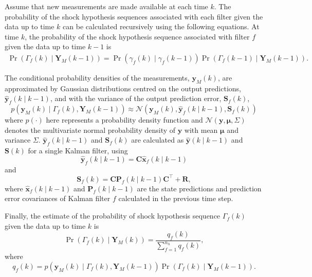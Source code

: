 {{Assume that new measurements are made available at each time $k$. The probability of the shock hypothesis sequences associated with each filter given the data up to time $k$ can be calculated recursively using the following equations. At time $k$, the probability of the shock hypothesis sequence associated with filter $f$ given the data up to time $k-1$ is
\begin{multline} \label{eq:Pr_Gammak_given_Ykm1}
	\Pr(\Gamma_f(k) \mid \mathbf{Y}_M(k-1)) = 
	\Pr(\gamma_f(k) \mid \gamma_f(k-1)) \Pr(\Gamma_f(k-1) \mid \mathbf{Y}_M(k-1)).
\end{multline}

The conditional probability densities of the measurements, $\mathbf{y}_M(k)$, are approximated by Gaussian distributions centred on the output predictions, $\mathbf{\hat{y}}_{f}(k \mid k-1)$,  and with the variance of the output prediction error, $\mathbf{S}_f(k)$,
\begin{equation} \label{eq:p_yk_given_Gammak_Ykm1}
	p(\mathbf{y}_M(k) \mid \Gamma_f(k), \mathbf{Y}_M(k-1)) \approx \mathcal{N}\left(\mathbf{y}_M(k), \mathbf{\hat{y}}_{f}(k \mid k-1),	\mathbf{S}_f(k) \right)
\end{equation}
%
where $p(\cdot)$ here represents a probability density function and $\mathcal{N}(\mathbf{y}, \mathbf{\mu}, \Sigma)$ denotes the multivariate normal probability density of $\mathbf{y}$ with mean $\mathbf{\mu}$ and variance $\Sigma$. $\mathbf{\hat{y}}_{f}(k \mid k-1)$ and $\mathbf{S}_f(k)$ are calculated as $\mathbf{\hat{y}}(k \mid k-1)$ and $\mathbf{S}(k)$ for a single Kalman filter, using 
\begin{equation} \label{eq:yfk_pred}
	\mathbf{\hat{y}}_{f}(k \mid k-1) = \mathbf{C}\mathbf{\hat{x}}_{f}(k \mid k-1)
\end{equation}
and
%
\begin{equation} \label{eq:Sfk}
	\mathbf{S}_f(k) = \mathbf{C}\mathbf{P}_f(k \mid k-1)\mathbf{C}^\intercal + \mathbf{R},
\end{equation}
where $\mathbf{\hat{x}}_{f}(k \mid k-1)$ and $\mathbf{P}_f(k \mid k-1)$ are the state predictions and prediction error covariances of Kalman filter $f$ calculated in the previous time step.

Finally, the estimate of the probability of shock hypothesis sequence $\Gamma_f(k)$ given the data up to time $k$ is
\begin{equation} \label{eq:Pr_Gammak_given_Yk}
	\Pr(\Gamma_f(k) \mid \mathbf{Y}_M(k)) = \frac{q_f(k)}{\sum_{f=1}^{n_h} q_f(k)},
\end{equation}
where
\begin{equation} \label{eq:qfk}
	q_f(k) = p(\mathbf{y}_M(k) \mid \Gamma_f(k), \mathbf{Y}_M(k-1)) \Pr(\Gamma_f(k) \mid \mathbf{Y}_M(k-1)).
\end{equation}

}}

